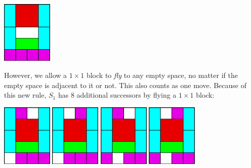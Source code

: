 \documentclass[10pt,a4paper]{article}
\begin{document}
\centerline{\includegraphics[width=0.18\textwidth]{figure_2.eps}}

However, we allow a $1\times1$ block to \emph{fly} to any empty space, no matter if the empty space is adjacent to it or not. 
This also counts as one move.
Because of this new rule, $S_1$ has 8 additional successors by flying a $1\times1$ block:

\centerline{
    \includegraphics[width=0.18\textwidth]{figure_3.eps}
    \includegraphics[width=0.18\textwidth]{figure_4.eps}
    \includegraphics[width=0.18\textwidth]{figure_5.eps}
    \includegraphics[width=0.18\textwidth]{figure_6.eps}
}
\end{document}
